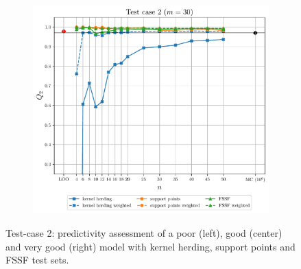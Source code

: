 \begin{landscape}
\begin{figure}
\begin{subfigure}[b]{0.32\linewidth}
    \end{subfigure}
    \centering
    \begin{subfigure}[b]{0.32\linewidth}
      \centering
      \includegraphics[width=\linewidth]{./part2/figures/SIS/cosin_learnsize_30.pdf}
    \end{subfigure}
    \caption{Test-case 2: predictivity assessment of a poor (left), good (center) and very good (right) model with kernel herding, support points and FSSF test sets.}
    \label{fig:cosin_benchmark}
  \end{figure}

\end{landscape}

